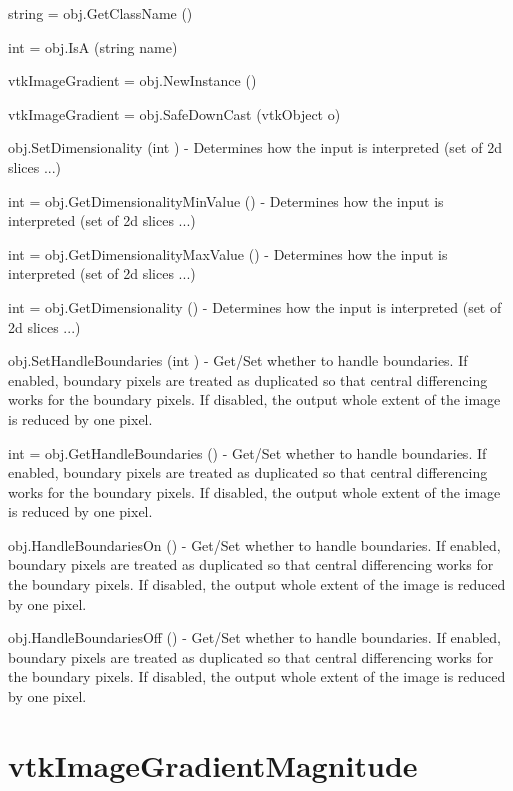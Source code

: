 \begin{DoxyItemize}
\item {\ttfamily string = obj.\-Get\-Class\-Name ()}  
\item {\ttfamily int = obj.\-Is\-A (string name)}  
\item {\ttfamily vtk\-Image\-Gradient = obj.\-New\-Instance ()}  
\item {\ttfamily vtk\-Image\-Gradient = obj.\-Safe\-Down\-Cast (vtk\-Object o)}  
\item {\ttfamily obj.\-Set\-Dimensionality (int )} -\/ Determines how the input is interpreted (set of 2d slices ...)  
\item {\ttfamily int = obj.\-Get\-Dimensionality\-Min\-Value ()} -\/ Determines how the input is interpreted (set of 2d slices ...)  
\item {\ttfamily int = obj.\-Get\-Dimensionality\-Max\-Value ()} -\/ Determines how the input is interpreted (set of 2d slices ...)  
\item {\ttfamily int = obj.\-Get\-Dimensionality ()} -\/ Determines how the input is interpreted (set of 2d slices ...)  
\item {\ttfamily obj.\-Set\-Handle\-Boundaries (int )} -\/ Get/\-Set whether to handle boundaries. If enabled, boundary pixels are treated as duplicated so that central differencing works for the boundary pixels. If disabled, the output whole extent of the image is reduced by one pixel.  
\item {\ttfamily int = obj.\-Get\-Handle\-Boundaries ()} -\/ Get/\-Set whether to handle boundaries. If enabled, boundary pixels are treated as duplicated so that central differencing works for the boundary pixels. If disabled, the output whole extent of the image is reduced by one pixel.  
\item {\ttfamily obj.\-Handle\-Boundaries\-On ()} -\/ Get/\-Set whether to handle boundaries. If enabled, boundary pixels are treated as duplicated so that central differencing works for the boundary pixels. If disabled, the output whole extent of the image is reduced by one pixel.  
\item {\ttfamily obj.\-Handle\-Boundaries\-Off ()} -\/ Get/\-Set whether to handle boundaries. If enabled, boundary pixels are treated as duplicated so that central differencing works for the boundary pixels. If disabled, the output whole extent of the image is reduced by one pixel.  
\end{DoxyItemize}\hypertarget{vtkimaging_vtkimagegradientmagnitude}{}\section{vtk\-Image\-Gradient\-Magnitude}\label{vtkimaging_vtkimagegradientmagnitude}
